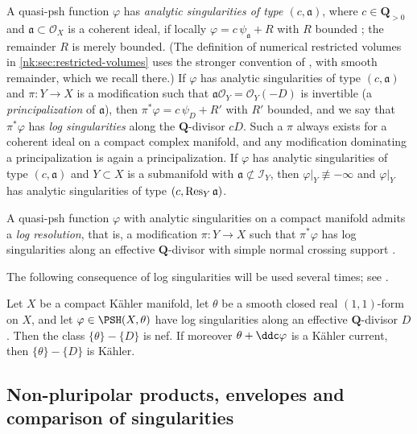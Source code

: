 A quasi-psh function $\varphi$ has \emph{analytic singularities of type
$(c,\mathfrak a)$}, where $c\in\mathbf Q_{>0}$ and $\mathfrak a\subset\mathcal O_X$ is a coherent
ideal, if locally $\varphi=c\,\psi_\mathfrak a+R$ with $R$ bounded
\cite[Definition~1.6.1]{SGPT}; the remainder $R$ is merely bounded.
(The definition of numerical restricted volumes in
\cref{nk:sec:restricted-volumes} uses the stronger convention of
\cite[Section~2]{CT22Restricted}, with smooth remainder, which we recall there.)
If $\varphi$ has analytic singularities of type
$(c,\mathfrak a)$ and $\pi\colon Y\to X$ is a modification such that
$\mathfrak a\mathcal O_Y=\mathcal O_Y(-D)$ is invertible (a \emph{principalization} of
$\mathfrak a$), then $\pi^*\varphi=c\,\psi_D+R'$ with $R'$ bounded, and we
say that $\pi^*\varphi$ has \emph{log singularities} along the
$\mathbf Q$-divisor $cD$. Such a $\pi$ always exists for a coherent ideal
on a compact complex manifold, and any modification dominating a
principalization is again a principalization. If $\varphi$ has analytic
singularities of type $(c,\mathfrak a)$ and $Y\subset X$ is a submanifold with
$\mathfrak a\not\subset\mathcal I_Y$, then $\varphi|_Y\not\equiv-\infty$ and
$\varphi|_Y$ has analytic singularities of type $(c,\operatorname{Res}_{Y}\mathfrak a)$.

A quasi-psh function $\varphi$ with analytic singularities on a compact
manifold admits a \emph{log resolution},
that is, a modification $\pi\colon Y\to X$ such that $\pi^*\varphi$ has
log singularities along an effective $\mathbf Q$-divisor with simple normal
crossing support \cite[Theorem~1.6.1]{SGPT}.

The following consequence of log singularities will be used several
times; see \cite[Lemma~1.6.1]{SGPT}.

\begin{lemma}\label{nk:lem:residual-nef}
Let $X$ be a compact K\"ahler manifold, let $\theta$ be a smooth
closed real $(1,1)$-form on $X$, and let $\varphi\in\PSH(X,\theta)$
have log singularities along an effective $\mathbf Q$-divisor $D$.
Then the class $\{\theta\}-\{D\}$ is nef. If moreover
$\theta+\ddc\varphi$ is a K\"ahler current, then $\{\theta\}-\{D\}$
is K\"ahler.
\end{lemma}

\subsection{Non-pluripolar products, envelopes and comparison of
singularities}\label{nk:sec:npp}

